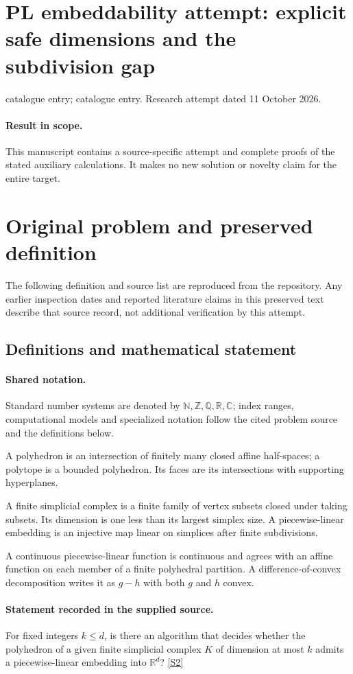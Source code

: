 \documentclass[11pt]{article}
\begin{document}
\section*{PL embeddability attempt: explicit safe dimensions and the subdivision gap}
\noindent catalogue entry; catalogue entry. Research attempt dated 11 October 2026.
\paragraph{Result in scope.}This manuscript contains a source-specific attempt and complete proofs of the stated auxiliary calculations. It makes no new solution or novelty claim for the entire target.
\section{Original problem and preserved definition}
The following definition and source list are reproduced from the repository. Any earlier inspection dates and reported literature claims in this preserved text describe that source record, not additional verification by this attempt.
\subsection{Definitions and mathematical statement}

\paragraph{Shared notation.}Standard number systems are denoted by $\mathbb N,\mathbb Z,\mathbb Q,\mathbb R,\mathbb C$; index ranges, computational models and specialized notation follow the cited problem source and the definitions below.


A polyhedron is an intersection of finitely many closed affine half-spaces; a polytope is a bounded polyhedron. Its faces are its intersections with supporting hyperplanes.

A finite simplicial complex is a finite family of vertex subsets closed under taking subsets. Its dimension is one less than its largest simplex size. A piecewise-linear embedding is an injective map linear on simplices after finite subdivisions.

A continuous piecewise-linear function is continuous and agrees with an affine function on each member of a finite polyhedral partition. A difference-of-convex decomposition writes it as $g-h$ with both $g$ and $h$ convex.
\paragraph{Statement recorded in the supplied source.}
For fixed integers $k\leq d$, is there an algorithm that decides whether the polyhedron of a given finite simplicial complex $K$ of dimension at most $k$ admits a piecewise-linear embedding into $\mathbb R^d$? \href{https://doi.org/10.4171/owr/2008/44}{[S2]}
\end{document}
